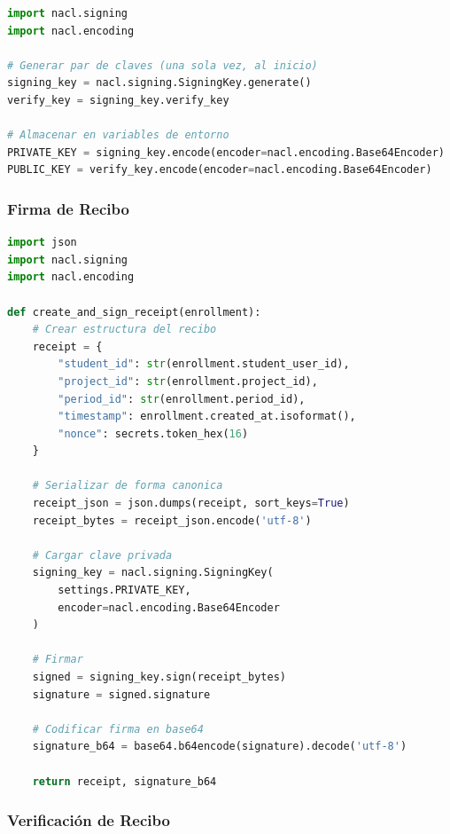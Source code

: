\documentclass[12pt,a4paper]{article}
\begin{document}
\begin{lstlisting}[language=Python]
import nacl.signing
import nacl.encoding

# Generar par de claves (una sola vez, al inicio)
signing_key = nacl.signing.SigningKey.generate()
verify_key = signing_key.verify_key

# Almacenar en variables de entorno
PRIVATE_KEY = signing_key.encode(encoder=nacl.encoding.Base64Encoder)
PUBLIC_KEY = verify_key.encode(encoder=nacl.encoding.Base64Encoder)
\end{lstlisting}

\subsubsection{Firma de Recibo}

\begin{lstlisting}[language=Python]
import json
import nacl.signing
import nacl.encoding

def create_and_sign_receipt(enrollment):
    # Crear estructura del recibo
    receipt = {
        "student_id": str(enrollment.student_user_id),
        "project_id": str(enrollment.project_id),
        "period_id": str(enrollment.period_id),
        "timestamp": enrollment.created_at.isoformat(),
        "nonce": secrets.token_hex(16)
    }
    
    # Serializar de forma canonica
    receipt_json = json.dumps(receipt, sort_keys=True)
    receipt_bytes = receipt_json.encode('utf-8')
    
    # Cargar clave privada
    signing_key = nacl.signing.SigningKey(
        settings.PRIVATE_KEY,
        encoder=nacl.encoding.Base64Encoder
    )
    
    # Firmar
    signed = signing_key.sign(receipt_bytes)
    signature = signed.signature
    
    # Codificar firma en base64
    signature_b64 = base64.b64encode(signature).decode('utf-8')
    
    return receipt, signature_b64
\end{lstlisting}

\subsubsection{Verificación de Recibo}
\end{document}
